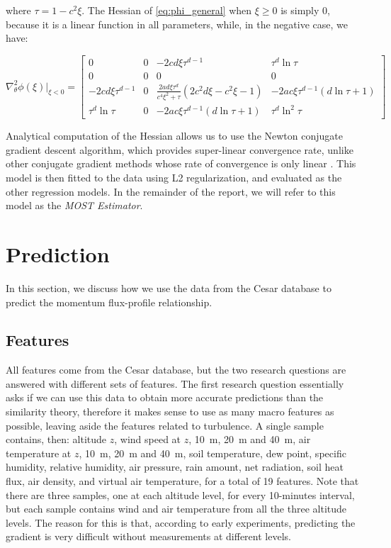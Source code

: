\documentclass[a4paper,11pt]{kth-mag}
\begin{document}
\noindent where $\tau=1-c^2\xi$. The Hessian of \ref{eq:phi_general} when $\xi\geq 0$ is simply 0, because it is a linear function in all parameters, while, in the negative case, we have:

\begin{equation}
\nabla^2_\theta\phi(\xi)\vert_{\xi<0} = \begin{bmatrix}
0 & 0 & - 2 c d \xi \tau^{d - 1} & \tau^{d} \ln{\tau} \\
0 & 0 & 0 & 0 \\
- 2 c d \xi \tau^{d - 1} &
0 & \frac{2ad\xi\tau^{d}}{c^4\xi^2+\tau}\left(2c^2d\xi-c^2\xi-1\right) & -2ac\xi\tau^{d-1}\left(d\ln\tau+1\right) \\
\tau^d \ln\tau & 0 &
-2ac\xi\tau^{d-1}\left(d\ln\tau+1\right) &
\tau^d\ln^2\tau
\end{bmatrix}
\end{equation}

Analytical computation of the Hessian allows us to use the Newton conjugate gradient descent algorithm, which provides super-linear convergence rate, unlike other conjugate gradient methods whose rate of convergence is only linear \citep{numopt}. This model is then fitted to the data using L2 regularization, and evaluated as the other regression models. In the remainder of the report, we will refer to this model as the \emph{MOST Estimator}.

\section{Prediction}
\label{sec:model_fit}
In this section, we discuss how we use the data from the Cesar database to predict the momentum flux-profile relationship.

\subsection{Features}
All features come from the Cesar database, but the two research questions are answered with different sets of features. The first research question essentially asks if we can use this data to obtain more accurate predictions than the similarity theory, therefore it makes sense to use as many macro features as possible, leaving aside the features related to turbulence. A single sample contains, then: altitude $z$, wind speed at $z$, \SI{10}{\meter}, \SI{20}{\meter} and \SI{40}{\meter}, air temperature at $z$, \SI{10}{\meter}, \SI{20}{\meter} and \SI{40}{\meter}, soil temperature, dew point, specific humidity, relative humidity, air pressure, rain amount, net radiation, soil heat flux, air density, and virtual air temperature, for a total of 19 features. Note that there are three samples, one at each altitude level, for every 10-minutes interval, but each sample contains wind and air temperature from all the three altitude levels. The reason for this is that, according to early experiments, predicting the gradient is very difficult without measurements at different levels.
\end{document}
